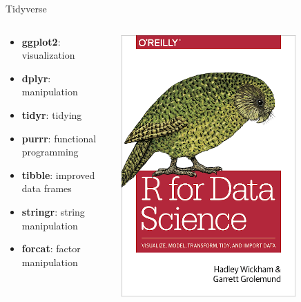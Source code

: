 \documentclass[aspectratio=169]{beamer}\usepackage[]{graphicx}\usepackage[]{color}
\begin{document}
\begin{frame}{Tidyverse}
\begin{columns}
  \begin{column}{0.6\textwidth}
    \begin{itemize}
    	\item \textbf{ggplot2}: visualization
    	\item \textbf{dplyr}: manipulation
    	\item \textbf{tidyr}: tidying
    	\item \textbf{purrr}: functional programming
    	\item \textbf{tibble}: improved data frames
    	\item \textbf{stringr}: string manipulation
    	\item \textbf{forcat}: factor manipulation
    \end{itemize}
	\end{column}
	\begin{column}{0.4\textwidth}
  \begin{center}
  	\includegraphics[width=0.75\textwidth]{./images/r4ds}
  \end{center}
\end{column}
\end{columns}
\end{frame}
\end{document}
